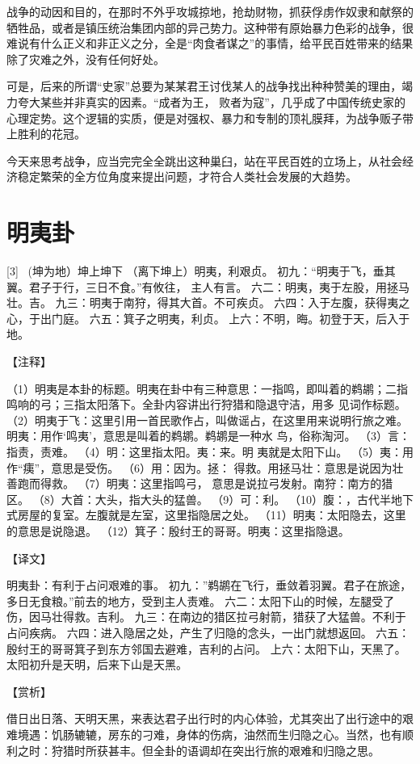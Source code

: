 \documentclass[12pt,UTF8]{ctexbook}
\begin{document}
战争的动因和目的，在那时不外乎攻城掠地，抢劫财物，抓获俘虏作奴隶和献祭的牺牲品，或者是镇压统治集团内部的异己势力。这种带有原始暴力色彩的战争，很难说有什么正义和非正义之分，全是“肉食者谋之”的事情，给平民百姓带来的结果除了灾难之外，没有任何好处。

可是，后来的所谓“史家”总要为某某君王讨伐某人的战争找出种种赞美的理由，竭力夸大某些并非真实的因素。“成者为王， 败者为寇”，几乎成了中国传统史家的心理定势。这个逻辑的实质，便是对强权、暴力和专制的顶礼膜拜，为战争贩子带上胜利的花冠。

今天来思考战争，应当完完全全跳出这种巢臼，站在平民百姓的立场上，从社会经济稳定繁荣的全方位角度来提出问题，才符合人类社会发展的大趋势。

\chapter{明夷卦}
[3] \ (坤为地）坤上坤下
（离下坤上）明夷，利艰贞。
初九：“明夷于飞，垂其翼。君子于行，三日不食。”有攸往， 主人有言。
六二：明夷，夷于左股，用拯马壮。吉。
九三：明夷于南狩，得其大首。不可疾贞。
六四：入于左腹，获得夷之心，于出门庭。
六五：箕子之明夷，利贞。
上六：不明，晦。初登于天，后入于地。

【注释】

（1）明夷是本卦的标题。明夷在卦中有三种意思：一指鸣，即叫着的鹈鹕；二指鸣响的弓；三指太阳落下。全卦内容讲出行狩猎和隐退守洁，用多 见词作标题。
（2）明夷于飞：这里引用一首民歌作占，叫做谣占，在这里用来说明行旅之难。明夷：用作‘鸣夷’，意思是叫着的鹈鹕。鹈鹕是一种水 鸟，俗称淘河。
（3）言：指责，责难。
（4）明：这里指太阳。夷：来。明 夷就是太阳下山。
（5）夷：用作“痍”，意思是受伤。
（6）用：因为。拯： 得救。用拯马壮：意思是说因为壮善跑而得救。
（7）明夷：这里指鸣弓， 意思是说拉弓发射。南狩：南方的猎区。
（8）大首：大头，指大头的猛兽。
（9）可：利。
（10）腹：，古代半地下式房屋的复室。左腹就是左室，这里指隐居之处。
（11）明夷：太阳隐去，这里的意思是说隐退。
（12）箕子：殷纣王的哥哥。明夷：这里指隐退。

【译文】

明夷卦：有利于占问艰难的事。
初九：”鹈鹕在飞行，垂敛着羽翼。君子在旅途，多日无食粮。”前去的地方，受到主人责难。
六二：太阳下山的时候，左腿受了伤，因马壮得救。吉利。
九三：在南边的猎区拉弓射箭，猎获了大猛兽。不利于占问疾病。
六四：进入隐居之处，产生了归隐的念头，一出门就想返回。
六五：殷纣王的哥哥箕子到东方邻国去避难，吉利的占问。
上六：太阳下山，天黑了。太阳初升是天明，后来下山是天黑。

【赏析】

借日出日落、天明天黑，来表达君子出行时的内心体验，尤其突出了出行途中的艰难境遇：饥肠辘辘，房东的刁难，身体的伤病，油然而生归隐之心。当然，也有顺利之时：狩猎时所获甚丰。但全卦的语调却在突出行旅的艰难和归隐之思。
\end{document}
